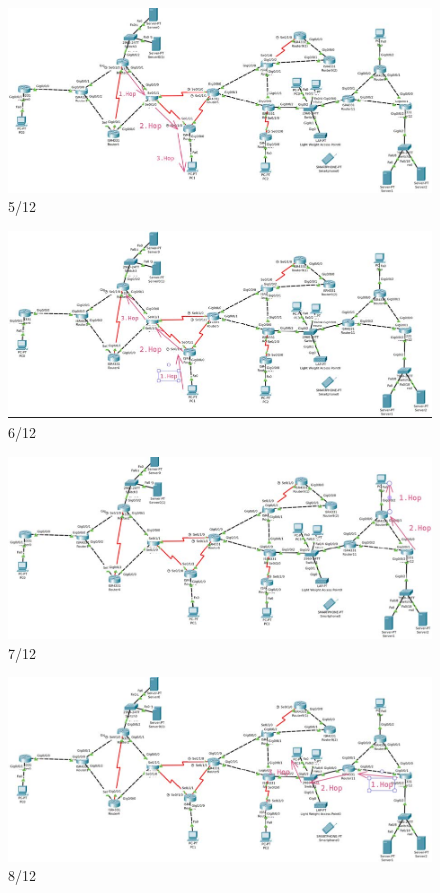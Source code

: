 \documentclass[a4paper]{article}
\begin{document}
\begin{figure}[h]
	\centering
	\includegraphics[scale=0.5]{5.jpg}
	\caption{5/12}
\end{figure}
\begin{figure}[h]
	\centering
	\includegraphics[scale=0.5]{6.jpg}
	\caption{6/12}
\end{figure}
\begin{figure}[h]
	\centering
	\includegraphics[scale=0.5]{7.jpg}
	\caption{7/12}
\end{figure}
\begin{figure}[h]
	\centering
	\includegraphics[scale=0.5]{8.jpg}
	\caption{8/12}
\end{figure}
\end{document}
